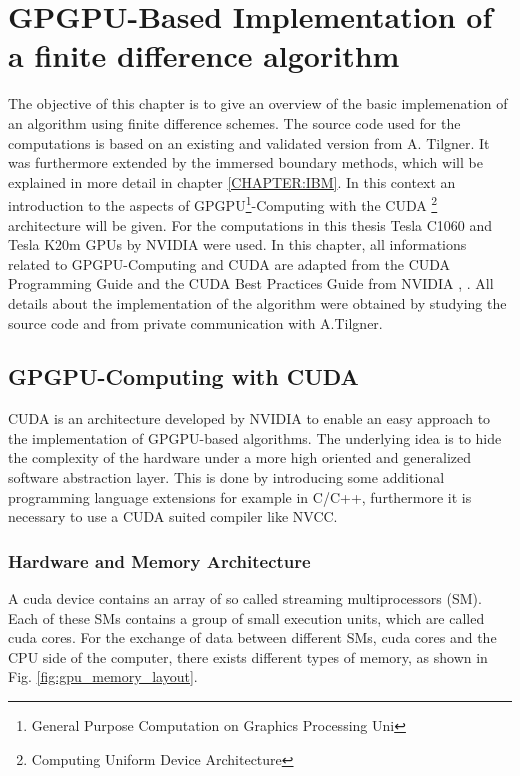 \chapter[ GPGPU-Based Implementation of a finite difference algorithm]{GPGPU-Based Implementation of \\ a finite difference algorithm}


The objective of this chapter is to give an overview of the basic implemenation of an algorithm using finite difference schemes.
The source code used for the computations is based on an existing and validated version from A. Tilgner.
It was furthermore extended by the immersed boundary methods, which will be explained in more detail in chapter \ref{CHAPTER:IBM}.
In this context an introduction to the aspects of GPGPU\footnote{General Purpose Computation on Graphics Processing Uni}-Computing
with the CUDA \footnote{Computing Uniform Device Architecture} architecture will be given.
For the computations in this thesis Tesla C1060 and Tesla K20m GPUs by NVIDIA were used.%
In this chapter, all informations related to GPGPU-Computing and CUDA are adapted from the CUDA Programming Guide and the CUDA Best Practices Guide from NVIDIA
\citep{CUDAPG}, \citep{CUDABP}. All details about the implementation of the algorithm were obtained by studying the source code
and from private communication with A.Tilgner.

\section{GPGPU-Computing with CUDA}

CUDA is an architecture developed by NVIDIA to enable an easy approach to the implementation of GPGPU-based algorithms.
The underlying idea is to hide the complexity of the hardware under a more high oriented and generalized software abstraction layer.
This is done by introducing some additional programming language extensions for example in C/C++,
furthermore it is necessary to use a CUDA suited compiler like NVCC.

\subsection{Hardware and Memory Architecture}

A cuda device contains an array of so called streaming multiprocessors (SM).
Each of these SMs contains a group of small execution units, which are called cuda cores.
For the exchange of data between different SMs, cuda cores and the CPU side of the computer, there exists different
types of memory, as shown  in Fig.  \ref{fig:gpu_memory_layout}.
\newpage

